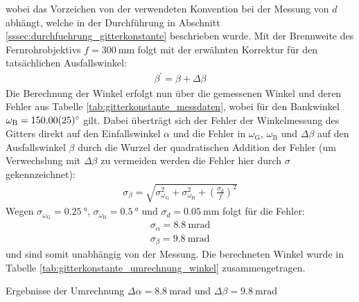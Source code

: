 \documentclass[11pt, a4paper]{article}
\numberwithin{equation}{section}
\begin{document}
wobei das Vorzeichen von der verwendeten Konvention bei der Messung von $d$ abhängt, welche in der Durchführung in Abschnitt \ref{sssec:durchfuehrung_gitterkonstante} beschrieben wurde.
Mit der Brennweite des Fernrohrobjektivs $f = \SI{300}{\milli\metre}$ folgt mit der erwähnten Korrektur für den tatsächlichen Ausfallswinkel:
\begin{align*}
	\beta^\prime = \beta + \Delta \beta
\end{align*}
Die Berechnung der Winkel erfolgt nun über die gemessenen Winkel und deren Fehler aus Tabelle \ref{tab:gitterkonstante_messdaten}, wobei für den Bankwinkel $\omega_\mathrm{B} = \SI{150 +- 0.25}{\degree}$ gilt.
Dabei überträgt sich der Fehler der Winkelmessung des Gitters direkt auf den Einfallswinkel $\alpha$ und die Fehler in $\omega_\mathrm{G}$, $\omega_\mathrm{B}$ und $\Delta \beta$ auf den Ausfallswinkel $\beta$ durch die Wurzel der quadratischen Addition der Fehler (um Verwechslung mit $\Delta \beta$ zu vermeiden werden die Fehler hier durch $\sigma$ gekennzeichnet):
\begin{align*}
	\sigma_\beta = \sqrt{\sigma_{\omega_\mathrm{G}}^2 + \sigma_{\omega_\mathrm{B}}^2 + \left(\frac{\sigma_d}{f}\right)^2}
\end{align*}
Wegen $\sigma_{\omega_\mathrm{G}} = \SI{0.25}{\degree}$, $\sigma_{\omega_\mathrm{B}} = \SI{0.5}{\degree}$ und $\sigma_d = \SI{0.05}{\milli\metre}$ folgt für die Fehler:
\begin{align*}
	\sigma_\alpha = \SI{8.8}{\milli\radian}\\
	\sigma_\beta = \SI{9.8}{\milli\radian}
\end{align*}
und sind somit unabhängig von der Messung.
Die berechneten Winkel wurde in Tabelle \ref{tab:gitterkonstante_umrechnung_winkel} zusammengetragen.
\begin{table}[h]
	\centering
	
	\caption{Ergebnisse der Umrechnung $\Delta \alpha = \SI{8.8}{\milli\radian}$ und $\Delta \beta = \SI{9.8}{\milli\radian}$}
	\label{tab:gitterkonstante_umrechnung_winkel}
\end{table}
\end{document}
